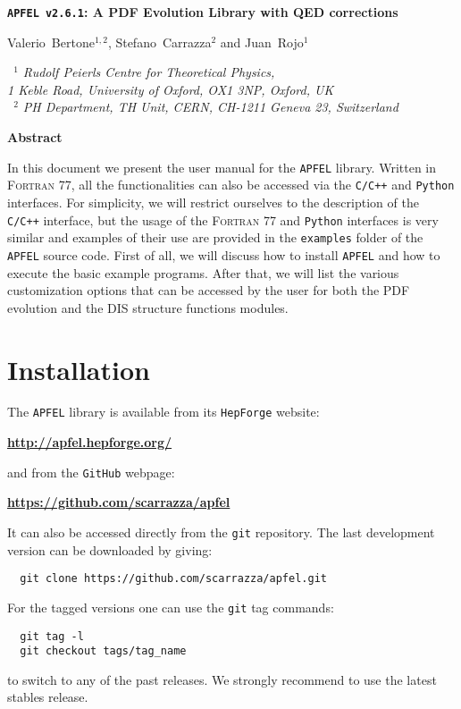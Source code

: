 \documentclass[11pt,a4paper]{article}
\begin{document}
\begin{center}
{\Large \bf {\tt APFEL v2.6.1}: A PDF Evolution Library with QED corrections}
\vspace{.7cm}

Valerio~Bertone$^{1,2}$,
Stefano~Carrazza$^{2}$ and Juan~Rojo$^1$

\vspace{.3cm}
{
\it ~$^1$ Rudolf Peierls Centre for Theoretical Physics,\\
\it 1 Keble Road, University of Oxford, OX1 3NP, Oxford, UK\\
\it ~$^2$ PH Department, TH Unit, CERN, CH-1211 Geneva 23, Switzerland \\
}
\end{center}

\vspace{0.1cm}

\begin{center}
{\bf \large Abstract}
\end{center}

In this document we present the user manual for the {\tt APFEL}
library. Written in {\scshape Fortran 77}, all the functionalities can
also be accessed via the {\tt C/C++} and {\tt Python} interfaces.  For
simplicity, we will restrict ourselves to the description of the {\tt
  C/C++} interface, but the usage of the {\scshape Fortran 77} and
{\tt Python} interfaces is very similar and examples of their use are
provided in the {\tt examples} folder of the {\tt APFEL} source code.
First of all, we will discuss how to install {\tt APFEL} and how to
execute the basic example programs. After that, we will list the
various customization options that can be accessed by the user for
both the PDF evolution and the DIS structure functions modules.

\tableofcontents

\section{Installation}

The  {\tt APFEL} library is available from its {\tt HepForge} website:
\begin{center}
{\bf \url{http://apfel.hepforge.org/}~}
\end{center}
and from the {\tt GitHub} webpage:
\begin{center}
{\bf \url{https://github.com/scarrazza/apfel}~}
\end{center}
It can also be accessed directly from the {\tt git} repository.
The last development version can be downloaded by giving:
\begin{lstlisting}
  git clone https://github.com/scarrazza/apfel.git
\end{lstlisting}
For the tagged versions one can use the {\tt git} tag commands:
\begin{lstlisting}
  git tag -l
  git checkout tags/tag_name
\end{lstlisting}
to switch to any of the past releases. We strongly recommend to use
the latest stables release.
\end{document}
